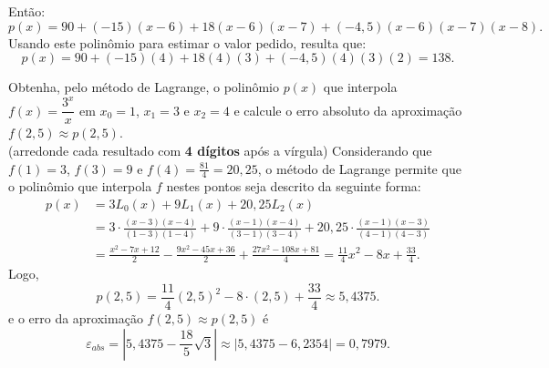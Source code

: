 \documentclass[12pt,a4paper]{article}
\begin{document}
\begin{ExerciseList}
Então:
\[
p(x) = 90 +(-15)(x-6) + 18(x-6)(x-7) +(-4,5)(x-6)(x-7)(x-8).
\]
Usando este polinômio para estimar o valor pedido, resulta que:
\[
p(x) = 90 +(-15)(4) + 18(4)(3) +(-4,5)(4)(3)(2)
= 138.
\]

\Exercise[title={2,5}]
Obtenha, pelo método de Lagrange, o polinômio $p(x)$ que interpola $f(x) = \dfrac{3^{x}}{x}$ em $x_0 = 1$, $x_1 = 3$ e $x_2 = 4$ e calcule o erro absoluto da aproximação $f(2,5) \approx p(2,5)$.
\\(arredonde cada resultado com \textbf{4 dígitos} após a vírgula)
\Answer
Considerando que $f(1) = 3$, $f(3) = 9$ e $f(4) = \frac{81}{4} = 20,25$, o método de Lagrange permite que o polinômio que interpola $f$ nestes pontos seja descrito da seguinte forma:
\begin{align*}
p(x)
& = 3 L_0(x) + 9 L_1(x) + 20,25 L_2(x) \\
& = 3 \cdot \frac{(x-3)(x-4)}{(1-3)(1-4)}
  + 9 \cdot \frac{(x-1)(x-4)}{(3-1)(3-4)}
  + 20,25 \cdot \frac{(x-1)(x-3)}{(4-1)(4-3)}\\
& = \frac{x^2 - 7 x + 12}{2}
    - \frac{9x^2 - 45x + 36}{2}
    + \frac{27x^2 - 108x + 81}{4}
  = \frac{11}{4} x^2 - 8x + \frac{33}{4}.
\end{align*}
Logo,
\[
p(2,5) = \frac{11}{4} (2,5)^2 - 8 \cdot (2,5) + \frac{33}{4} \approx 5,4375.
\]
e o erro da aproximação $f(2,5) \approx p(2,5)$ é
\[
\varepsilon_{abs}
= \left|5,4375 - \frac{18}{5} \sqrt{3}\right|
\approx \left|5,4375 -6,2354\right|
= 0,7979.
\]




\end{ExerciseList}
\end{document}

